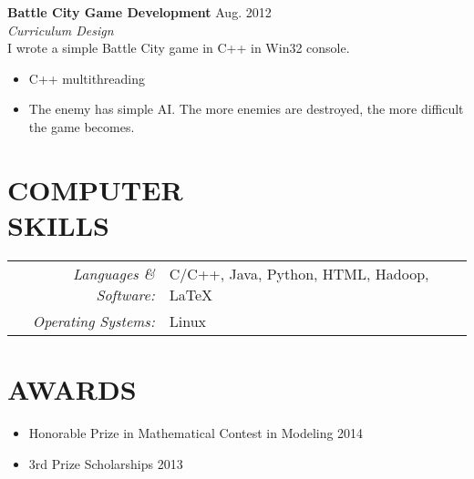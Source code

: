 \documentclass[margin,10pt]{res} %
\begin{document}
\begin{resume}
{\bf Battle City Game Development} \hfill Aug. 2012 \\
\textit{Curriculum Design}\\
I wrote a simple Battle City game in C++ in Win32 console.
\begin{itemize}
\item C++ multithreading
\item The enemy has simple AI. The more enemies are destroyed, the more difficult the game becomes.
\end{itemize}


\section{COMPUTER \\ SKILLS}
\begin{tabular}{rl}
{\sl Languages \& Software:}
& C/C++, Java, Python, HTML, Hadoop, \LaTeX \\
{\sl Operating Systems:} & Linux
\end{tabular}



\section{AWARDS}
\begin{itemize}\itemsep -12pt
    \item Honorable Prize in Mathematical Contest in Modeling {\hfill 2014}\\
    \item 3rd Prize Scholarships {\hfill 2013}\\


\end{itemize}
\end{resume}
\end{document}
